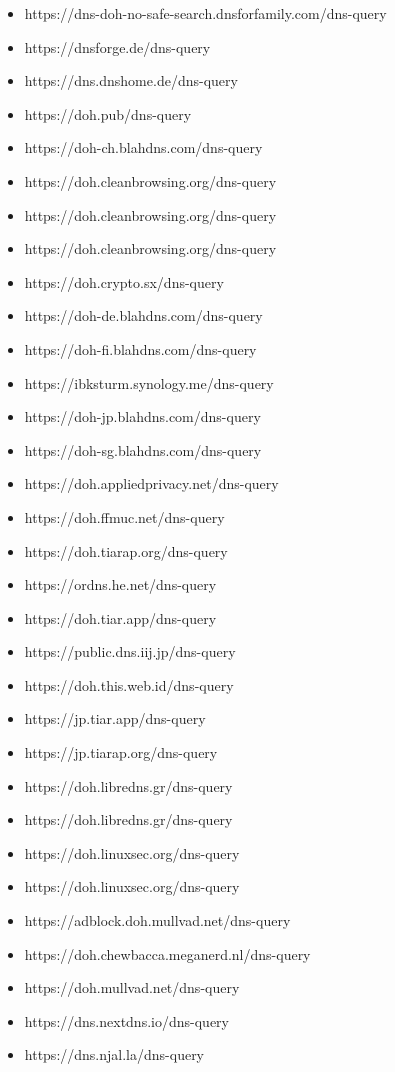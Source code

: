 \begin{itemize}
\item https://dns-doh-no-safe-search.dnsforfamily.com/dns-query
\item https://dnsforge.de/dns-query
\item https://dns.dnshome.de/dns-query
\item https://doh.pub/dns-query
\item https://doh-ch.blahdns.com/dns-query
\item https://doh.cleanbrowsing.org/dns-query
\item https://doh.cleanbrowsing.org/dns-query
\item https://doh.cleanbrowsing.org/dns-query
\item https://doh.crypto.sx/dns-query
\item https://doh-de.blahdns.com/dns-query
\item https://doh-fi.blahdns.com/dns-query
\item https://ibksturm.synology.me/dns-query
\item https://doh-jp.blahdns.com/dns-query
\item https://doh-sg.blahdns.com/dns-query
\item https://doh.appliedprivacy.net/dns-query
\item https://doh.ffmuc.net/dns-query
\item https://doh.tiarap.org/dns-query
\item https://ordns.he.net/dns-query
\item https://doh.tiar.app/dns-query
\item https://public.dns.iij.jp/dns-query
\item https://doh.this.web.id/dns-query
\item https://jp.tiar.app/dns-query
\item https://jp.tiarap.org/dns-query
\item https://doh.libredns.gr/dns-query
\item https://doh.libredns.gr/dns-query
\item https://doh.linuxsec.org/dns-query
\item https://doh.linuxsec.org/dns-query
\item https://adblock.doh.mullvad.net/dns-query
\item https://doh.chewbacca.meganerd.nl/dns-query
\item https://doh.mullvad.net/dns-query
\item https://dns.nextdns.io/dns-query
\item https://dns.njal.la/dns-query

\end{itemize}
